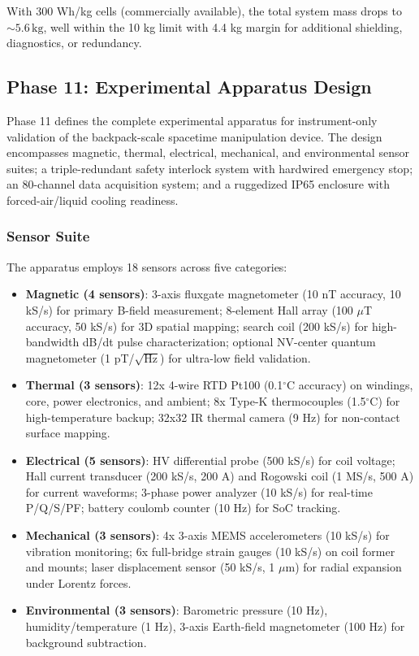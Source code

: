 With 300 Wh/kg cells (commercially available), the total system mass drops to $\sim 5.6\,\text{kg}$, well within the 10 kg limit with 4.4 kg margin for additional shielding, diagnostics, or redundancy.

\subsection{Phase 11: Experimental Apparatus Design}
\label{sec:phase11-experimental}

Phase 11 defines the complete experimental apparatus for instrument-only validation of the backpack-scale spacetime manipulation device. The design encompasses magnetic, thermal, electrical, mechanical, and environmental sensor suites; a triple-redundant safety interlock system with hardwired emergency stop; an 80-channel data acquisition system; and a ruggedized IP65 enclosure with forced-air/liquid cooling readiness.

\subsubsection{Sensor Suite}

The apparatus employs 18 sensors across five categories:

\begin{itemize}
    \item \textbf{Magnetic (4 sensors)}: 3-axis fluxgate magnetometer (10 nT accuracy, 10 kS/s) for primary B-field measurement; 8-element Hall array (100 $\mu$T accuracy, 50 kS/s) for 3D spatial mapping; search coil (200 kS/s) for high-bandwidth dB/dt pulse characterization; optional NV-center quantum magnetometer (1 pT/$\sqrt{\text{Hz}}$) for ultra-low field validation.
    \item \textbf{Thermal (3 sensors)}: 12x 4-wire RTD Pt100 (0.1$^\circ$C accuracy) on windings, core, power electronics, and ambient; 8x Type-K thermocouples (1.5$^\circ$C) for high-temperature backup; 32x32 IR thermal camera (9 Hz) for non-contact surface mapping.
    \item \textbf{Electrical (5 sensors)}: HV differential probe (500 kS/s) for coil voltage; Hall current transducer (200 kS/s, 200 A) and Rogowski coil (1 MS/s, 500 A) for current waveforms; 3-phase power analyzer (10 kS/s) for real-time P/Q/S/PF; battery coulomb counter (10 Hz) for SoC tracking.
    \item \textbf{Mechanical (3 sensors)}: 4x 3-axis MEMS accelerometers (10 kS/s) for vibration monitoring; 6x full-bridge strain gauges (10 kS/s) on coil former and mounts; laser displacement sensor (50 kS/s, 1 $\mu$m) for radial expansion under Lorentz forces.
    \item \textbf{Environmental (3 sensors)}: Barometric pressure (10 Hz), humidity/temperature (1 Hz), 3-axis Earth-field magnetometer (100 Hz) for background subtraction.
\end{itemize}

